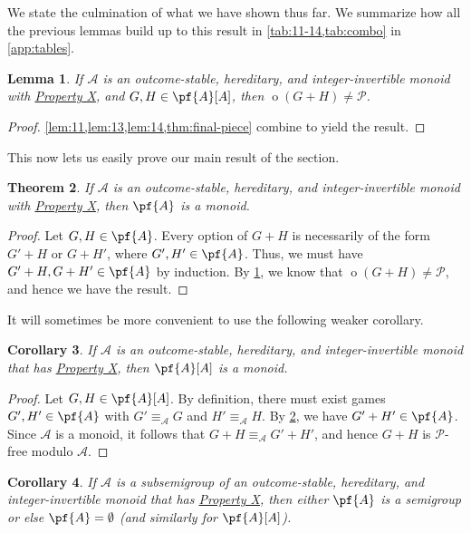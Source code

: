 \documentclass[11pt]{article}
\newtheorem{theorem}{Theorem}[section]
\newtheorem{lemma}[theorem]{Lemma}
\newtheorem{corollary}[theorem]{Corollary}
\theoremstyle{definition}
\DeclareMathOperator{\outcome}{o}
\newcommand{\set}[1]{\mathcal{#1}}
\begin{document}
We state the culmination of what we have shown thus far. We summarize how all
the previous lemmas build up to this result in \cref{tab:11-14,tab:combo} in
\cref{app:tables}.

\begin{lemma}
    \label{thm:pfree-sum}
    If $\set{A}$ is an outcome-stable, hereditary, and integer-invertible
    monoid with \hyperlink{prop:X}{Property X}, and $G,H\in\pf{A}[A]$, then
    $\outcome(G+H)\neq\mathscr{P}$.
\end{lemma}

\begin{proof}
    \cref{lem:11,lem:13,lem:14,thm:final-piece} combine to yield the result.
\end{proof}

This now lets us easily prove our main result of the section.

\begin{theorem}
    \label{thm:p-free-closed}
    If $\set{A}$ is an outcome-stable, hereditary, and integer-invertible
    monoid with \hyperlink{prop:X}{Property X}, then $\pf{A}$ is a monoid.
\end{theorem}

\begin{proof}
    Let $G,H\in\pf{A}$. Every option of $G+H$ is necessarily of the form $G'+H$
    or $G+H'$, where $G',H'\in\pf{A}$. Thus, we must have $G'+H,G+H'\in\pf{A}$
    by induction. By \cref{thm:pfree-sum}, we know that
    $\outcome(G+H)\neq\mathscr{P}$, and hence we have the result.
\end{proof}

It will sometimes be more convenient to use the following weaker corollary.

\begin{corollary}
    If $\set{A}$ is an outcome-stable, hereditary, and integer-invertible
    monoid that has \hyperlink{prop:X}{Property X}, then $\pf{A}[A]$ is a
    monoid.
\end{corollary}

\begin{proof}
    Let $G,H\in\pf{A}[A]$. By definition, there must exist games
    $G',H'\in\pf{A}$ with $G'\equiv_\set{A}G$ and $H'\equiv_\set{A}H$. By
    \cref{thm:p-free-closed}, we have $G'+H'\in\pf{A}$. Since $\set{A}$ is a
    monoid, it follows that $G+H\equiv_\set{A}G'+H'$, and hence $G+H$ is
    $\mathscr{P}$-free modulo $\set{A}$.
\end{proof}

\begin{corollary}
    \label{thm:p-free-semigroup}
    If $\set{A}$ is a subsemigroup of an outcome-stable, hereditary, and
    integer-invertible monoid that has \hyperlink{prop:X}{Property X}, then
    either $\pf{A}$ is a semigroup or else $\pf{A}=\emptyset$ (and similarly
    for $\pf{A}[A]$).
\end{corollary}
\end{document}
